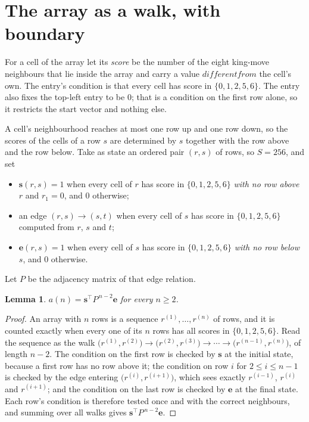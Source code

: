 \documentclass[11pt,a4paper]{article}
\theoremstyle{plain}
\newtheorem{lemma}[theorem]{Lemma}
\theoremstyle{definition}
\begin{document}
\section{The array as a walk, with boundary}

For a cell of the array let its \emph{score} be the number of the eight king-move neighbours that lie inside
the array and carry a value $different from$ the cell's own. The entry's condition is that every cell
has score in $\{0,1,2,5,6\}$. The entry also fixes the top-left entry to be $0$; that is a condition on the first row alone, so it restricts the start vector and nothing else.

A cell's neighbourhood reaches at most one row up and one row down, so the scores of the
cells of a row $s$ are determined by $s$ together with the row above and the row below.
Take as state an ordered pair $(r,s)$ of rows, so $S=256$, and set
\begin{itemize}
\item $\mathbf{s}(r,s)=1$ when every cell of $r$ has score in $\{0,1,2,5,6\}$ \emph{with no row
above $r$} and $r_1=0$, and $0$ otherwise;
\item an edge $(r,s)\to(s,t)$ when every cell of $s$ has score in $\{0,1,2,5,6\}$ computed from
$r$, $s$ and $t$;
\item $\mathbf{e}(r,s)=1$ when every cell of $s$ has score in $\{0,1,2,5,6\}$ \emph{with no row
below $s$}, and $0$ otherwise.
\end{itemize}
Let $P$ be the adjacency matrix of that edge relation.

\begin{lemma}\label{lem:walk}
$a(n)=\mathbf{s}^{\!\top}P^{\,n-2}\mathbf{e}$ for every $n\ge2$.
\end{lemma}

\begin{proof}
An array with $n$ rows is a sequence $r^{(1)},\dots,r^{(n)}$ of rows, and it is counted
exactly when every one of its $n$ rows has all scores in $\{0,1,2,5,6\}$. Read the sequence as the
walk $\bigl(r^{(1)},r^{(2)}\bigr)\to\bigl(r^{(2)},r^{(3)}\bigr)\to\cdots\to
\bigl(r^{(n-1)},r^{(n)}\bigr)$, of length $n-2$. The condition on the first row is
checked by $\mathbf{s}$ at the initial state, because a first row has no row above it; the
condition on row $i$ for $2\le i\le n-1$ is checked by the edge entering
$\bigl(r^{(i)},r^{(i+1)}\bigr)$, which sees exactly $r^{(i-1)}$, $r^{(i)}$ and
$r^{(i+1)}$; and the condition on the last row is checked by $\mathbf{e}$ at the final
state. Each row's condition is therefore tested once and with the correct neighbours, and
summing over all walks gives $\mathbf{s}^{\!\top}P^{\,n-2}\mathbf{e}$.
\end{proof}
\end{document}
